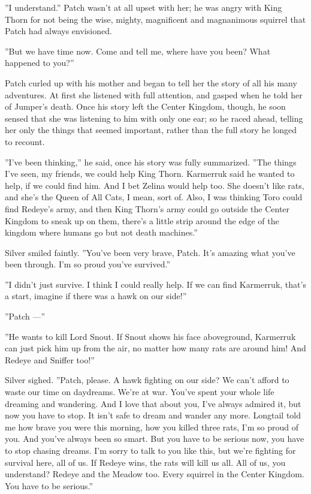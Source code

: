 \documentclass[12pt]{book}
\begin{document}
''I understand.'' Patch wasn't at all upset with her; he was angry
with King Thorn for not being the wise, mighty, magnificent and
magnanimous squirrel that Patch had always envisioned.

''But we have time now. Come and tell me, where have you been? What
happened to you?''

Patch curled up with his mother and began to tell her the story of all
his many adventures. At first she listened with full attention, and
gasped when he told her of Jumper's death. Once his story left the
Center Kingdom, though, he soon sensed that she was listening to him
with only one ear; so he raced ahead, telling her only the things that
seemed important, rather than the full story he longed to recount.

''I've been thinking,'' he said, once his story was fully
summarized. ''The things I've seen, my friends, we could help King
Thorn. Karmerruk said he wanted to help, if we could find him. And I
bet Zelina would help too. She doesn't like rats, and she's the Queen
of All Cats, I mean, sort of. Also, I was thinking Toro could find
Redeye's army, and then King Thorn's army could go outside the Center
Kingdom to sneak up on them, there's a little strip around the edge of
the kingdom where humans go but not death machines.''

Silver smiled faintly. ''You've been very brave, Patch. It's amazing
what you've been through. I'm so proud you've survived.''

''I didn't just survive. I think I could really help. If we can find
Karmerruk, that's a start, imagine if there was a hawk on our side!''

''Patch ---''

''He wants to kill Lord Snout. If Snout shows his face aboveground,
Karmerruk can just pick him up from the air, no matter how many rats
are around him! And Redeye and Sniffer too!''

Silver sighed. ''Patch, please. A hawk fighting on our side? We can't
afford to waste our time on daydreams. We're at war. You've spent your
whole life dreaming and wandering. And I love that about you, I've
always admired it, but now you have to stop. It isn't safe to dream
and wander any more. Longtail told me how brave you were this morning,
how you killed three rats, I'm so proud of you. And you've always been
so smart. But you have to be serious now, you have to stop chasing
dreams. I'm sorry to talk to you like this, but we're fighting for
survival here, all of us. If Redeye wins, the rats will kill us
all. All of us, you understand? Redeye and the Meadow too. Every
squirrel in the Center Kingdom. You have to be serious.''
\end{document}
